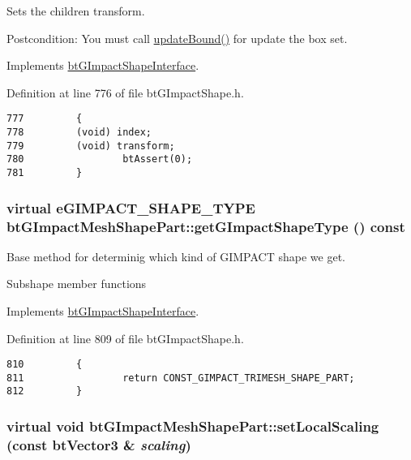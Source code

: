 Sets the children transform. 

\begin{Desc}
\item[Postcondition:]You must call \hyperlink{classbt_g_impact_shape_interface_cb26c2d7a2aecabd06b996b72b848492}{updateBound()} for update the box set. \end{Desc}


Implements \hyperlink{classbt_g_impact_shape_interface_83392f97bd7dfeb71ccdce6913a465b0}{btGImpactShapeInterface}.

Definition at line 776 of file btGImpactShape.h.

\begin{Code}\begin{verbatim}777         {
778         (void) index;
779         (void) transform;
780                 btAssert(0);
781         }
\end{verbatim}
\end{Code}


\hypertarget{classbt_g_impact_mesh_shape_part_5ff615b55a2bdaeba511fb116a9ab546}{
\subsubsection[getGImpactShapeType]{\setlength{\rightskip}{0pt plus 5cm}virtual eGIMPACT\_\-SHAPE\_\-TYPE btGImpactMeshShapePart::getGImpactShapeType () const}}
\label{classbt_g_impact_mesh_shape_part_5ff615b55a2bdaeba511fb116a9ab546}


Base method for determinig which kind of GIMPACT shape we get. 

Subshape member functions 

Implements \hyperlink{classbt_g_impact_shape_interface_25cacbe448997e3f8ec99cb2d4952859}{btGImpactShapeInterface}.

Definition at line 809 of file btGImpactShape.h.

\begin{Code}\begin{verbatim}810         {
811                 return CONST_GIMPACT_TRIMESH_SHAPE_PART;
812         }
\end{verbatim}
\end{Code}


\hypertarget{classbt_g_impact_mesh_shape_part_2c1de297d020a75e1ab0f10f7c71478f}{
\subsubsection[setLocalScaling]{\setlength{\rightskip}{0pt plus 5cm}virtual void btGImpactMeshShapePart::setLocalScaling (const btVector3 \& {\em scaling})}}
\label{classbt_g_impact_mesh_shape_part_2c1de297d020a75e1ab0f10f7c71478f}


